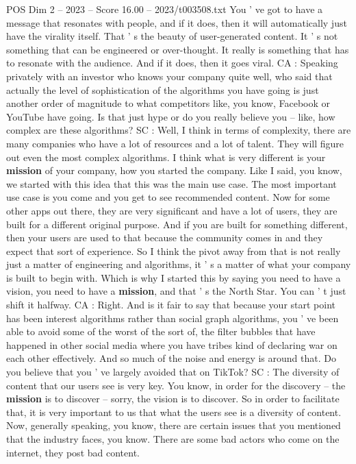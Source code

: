 \begin{textsample}{POS Dim 2 – 2023 – Score 16.00 – 2023/t003508.txt}
You ' ve got to have a message that resonates with people, and if it does, then it will automatically just have the virality itself.
That ' s the beauty of user-generated content.
It ' s not something that can be engineered or over-thought.
It really is something that has to resonate with the audience.
And if it does, then it goes viral.
CA : Speaking privately with an investor who knows your company quite well, who said that actually the level of sophistication of the algorithms you have going is just another order of magnitude to what competitors like, you know, Facebook or YouTube have going.
Is that just hype or do you really believe you -- like, how complex are these algorithms?
SC : Well, I think in terms of complexity, there are many companies who have a lot of resources and a lot of talent.
They will figure out even the most complex algorithms.
I think what is very different is your \textbf{mission} of your company, how you started the company.
Like I said, you know, we started with this idea that this was the main use case.
The most important use case is you come and you get to see recommended content.
Now for some other apps out there, they are very significant and have a lot of users, they are built for a different original purpose.
And if you are built for something different, then your users are used to that because the community comes in and they expect that sort of experience.
So I think the pivot away from that is not really just a matter of engineering and algorithms, it ' s a matter of what your company is built to begin with.
Which is why I started this by saying you need to have a vision, you need to have a \textbf{mission}, and that ' s the North Star.
You can ' t just shift it halfway.
CA : Right.
And is it fair to say that because your start point has been interest algorithms rather than social graph algorithms, you ' ve been able to avoid some of the worst of the sort of, the filter bubbles that have happened in other social media where you have tribes kind of declaring war on each other effectively.
And so much of the noise and energy is around that.
Do you believe that you ' ve largely avoided that on TikTok?
SC : The diversity of content that our users see is very key.
You know, in order for the discovery -- the \textbf{mission} is to discover -- sorry, the vision is to discover.
So in order to facilitate that, it is very important to us that what the users see is a diversity of content.
Now, generally speaking, you know, there are certain issues that you mentioned that the industry faces, you know.
There are some bad actors who come on the internet, they post bad content.

\end{textsample}
